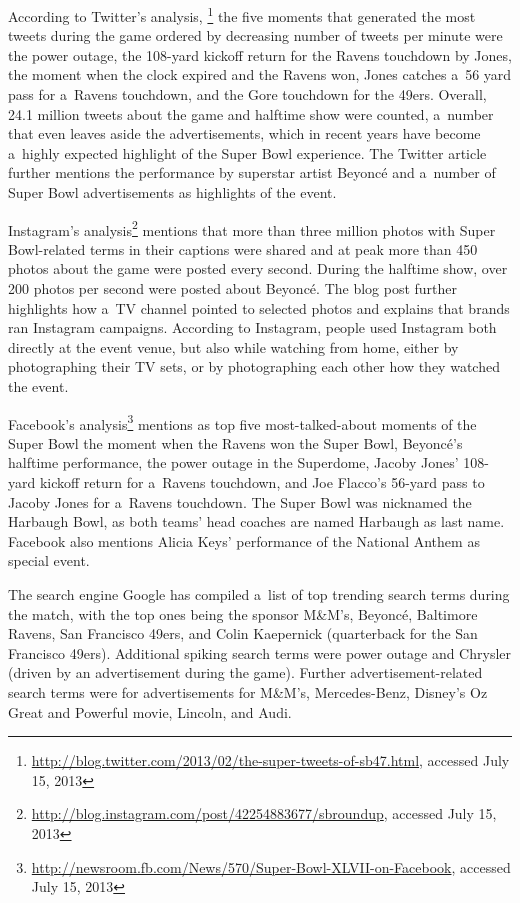 According to Twitter's analysis,%
\footnote{\url{http://blog.twitter.com/2013/02/the-super-tweets-of-sb47.html},
accessed July 15, 2013}
the five moments that generated the most tweets
during the game ordered by decreasing number of tweets per minute were
the power outage,
the 108-yard kickoff return for the Ravens touchdown by Jones,
the moment when the clock expired and the Ravens won,
Jones catches a~56 yard pass for a~Ravens touchdown,
and the Gore touchdown for the 49ers.
Overall, 24.1 million tweets about the game and halftime show were counted,
a~number that even leaves aside the advertisements,
which in recent years have become a~highly expected highlight
of the Super Bowl experience.
The Twitter article further mentions the performance by superstar artist Beyoncé
and a~number of Super Bowl advertisements as highlights of the event.

Instagram's analysis\footnote{\url{http://blog.instagram.com/post/42254883677/sbroundup},
accessed July 15, 2013}
mentions that more than three million photos
with Super Bowl-related terms in their captions were shared and
at peak more than 450 photos about the game were posted every second.
During the halftime show, over 200 photos per second were posted about Beyoncé.
The blog post further highlights how a~TV channel pointed to selected photos
and explains that brands ran Instagram campaigns.
According to Instagram, people used Instagram both directly at the event venue,
but also while watching from home, either by photographing their TV sets,
or by photographing each other how they watched the event.

Facebook's analysis\footnote{\url{http://newsroom.fb.com/News/570/Super-Bowl-XLVII-on-Facebook},
accessed July 15, 2013}
mentions as top five most-talked-about moments of the Super Bowl
the moment when the Ravens won the Super Bowl,
Beyoncé's halftime performance,
the power outage in the Superdome,
Jacoby Jones' 108-yard kickoff return for a~Ravens touchdown, and
Joe Flacco's 56-yard pass to Jacoby Jones for a~Ravens touchdown.
The Super Bowl was nicknamed the Harbaugh Bowl, as both teams' head coaches
are named Harbaugh as last name.
Facebook also mentions Alicia Keys' performance of the National Anthem as special event.

The search engine Google has compiled a~list of top trending search terms
during the match, with the top ones being the sponsor M\&M's, Beyoncé, Baltimore Ravens,
San Francisco 49ers, and Colin Kaepernick (quarterback for the San Francisco 49ers).
Additional spiking search terms were power outage
and Chrysler (driven by an advertisement during the game).
Further advertisement-related search terms were for advertisements for M\&M's,
Mercedes-Benz, Disney's Oz Great and Powerful movie, Lincoln, and Audi.

